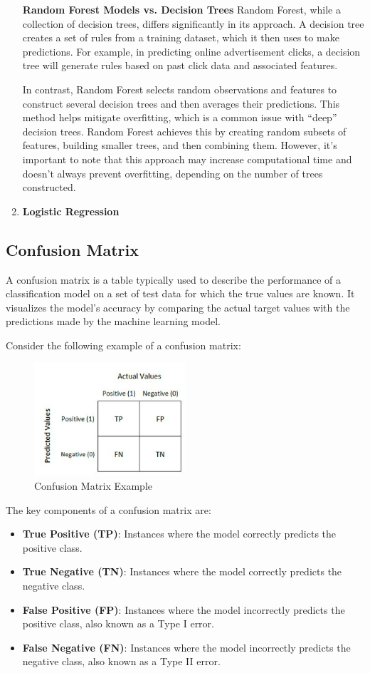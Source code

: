 \begin{enumerate}
\textbf{Random Forest Models vs. Decision Trees}
Random Forest, while a collection of decision trees, differs significantly in its approach. A decision tree creates a set of rules from a training dataset, which it then uses to make predictions. For example, in predicting online advertisement clicks, a decision tree will generate rules based on past click data and associated features.

In contrast, Random Forest selects random observations and features to construct several decision trees and then averages their predictions. This method helps mitigate overfitting, which is a common issue with “deep” decision trees. Random Forest achieves this by creating random subsets of features, building smaller trees, and then combining them. However, it’s important to note that this approach may increase computational time and doesn't always prevent overfitting, depending on the number of trees constructed.

	\item \textbf{Logistic Regression}
\end{enumerate}

\subsection{Confusion Matrix}
A confusion matrix is a table typically used to describe the performance of a classification model on a set of test data for which the true values are known. It visualizes the model's accuracy by comparing the actual target values with the predictions made by the machine learning model.

Consider the following example of a confusion matrix:
\begin{figure}[h]
	\centering
	\includegraphics[width=0.5\textwidth]{picture/confusion}
	\caption{Confusion Matrix Example}
	\label{fig:confusion_matrix}
\end{figure}

The key components of a confusion matrix are:
\begin{itemize}
	\item \textbf{True Positive (TP)}: Instances where the model correctly predicts the positive class.
	\item \textbf{True Negative (TN)}: Instances where the model correctly predicts the negative class.
	\item \textbf{False Positive (FP)}: Instances where the model incorrectly predicts the positive class, also known as a Type I error.
	\item \textbf{False Negative (FN)}: Instances where the model incorrectly predicts the negative class, also known as a Type II error.
\end{itemize}

